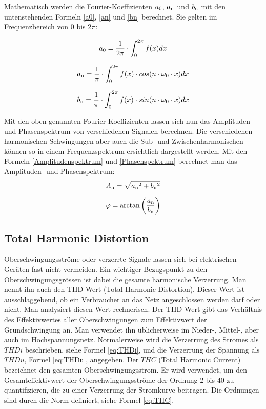 Mathematisch werden die Fourier-Koeffizienten $a\textsubscript{0}$, $a\textsubscript{n}$ und $b\textsubscript{n}$ mit den untenstehenden Formeln \ref{a0}, \ref{an} und \ref{bn} berechnet. Sie gelten im Frequenzbereich von 0 bis 2$\pi$: 

\begin{equation}\label{a0}
a\textsubscript{0} =  {\frac{1}{2\pi} \cdot \int_{0}^{2\pi} f(x) dx}
\end{equation}

\begin{equation}\label{an}
a\textsubscript{n} =  {\frac{1}{\pi} \cdot \int_{0}^{2\pi} f(x) \cdot cos(n \cdot \omega_0 \cdot x) dx}
\end{equation}

\begin{equation}\label{bn}
b\textsubscript{n} =  {\frac{1}{\pi} \cdot \int_{0}^{2\pi} f(x) \cdot sin(n \cdot \omega_0 \cdot x) dx}
\end{equation}

Mit den oben genannten Fourier-Koeffizienten lassen sich nun das Amplituden- und Phasenspektrum von verschiedenen Signalen berechnen. Die verschiedenen harmonischen Schwingungen aber auch die Sub- und Zwischenharmonischen können so in einem Frequenzspektrum ersichtlich dargestellt werden. Mit den Formeln \ref{Amplitudenspektrum} und \ref{Phasenspektrum} berechnet man das Amplituden- und Phasenspektrum:
\begin{equation}\label{Amplitudenspektrum}
A\textsubscript{n} = {\sqrt{a\textsubscript{n}^2+b\textsubscript{n}^2}}
\end{equation}

\begin{equation}\label{Phasenspektrum}
\varphi = \arctan\left( \frac{a\textsubscript{n}}{b\textsubscript{n}}\right) 
\end{equation}



\subsection{Total Harmonic Distortion}
Oberschwingungsströme oder verzerrte Signale lassen sich bei elektrischen Geräten fast nicht vermeiden. Ein wichtiger Bezugspunkt zu den Oberschwingungsgrössen ist dabei die gesamte harmonische Verzerrung. Man nennt ihn auch den THD-Wert (Total Harmonic Distortion). Dieser Wert ist ausschlaggebend, ob ein Verbraucher an das Netz angeschlossen werden darf oder nicht. Man analysiert diesen Wert rechnerisch. Der THD-Wert gibt das Verhältnis des Effektivwertes aller Oberschwingungen zum Effektivwert der Grundschwingung an. Man verwendet ihn üblicherweise im Nieder-, Mittel-, aber auch im Hochspannungsnetz. Normalerweise wird die Verzerrung des Stromes als $THDi$ beschrieben, siehe Formel \ref{eq:THDi}, und die Verzerrung der Spannung als $THDu$, Formel \ref{eq:THDu}, angegeben. Der $THC$ (Total Harmonic Current) bezeichnet den gesamten Oberschwingungsstrom. Er wird verwendet, um den Gesamteffektivwert der Oberschwingungsströme der Ordnung 2 bis 40 zu quantifizieren, die zu einer Verzerrung der Stromkurve beitragen. Die Ordnungen sind durch die Norm definiert, siehe Formel \ref{eq:THC}. 

